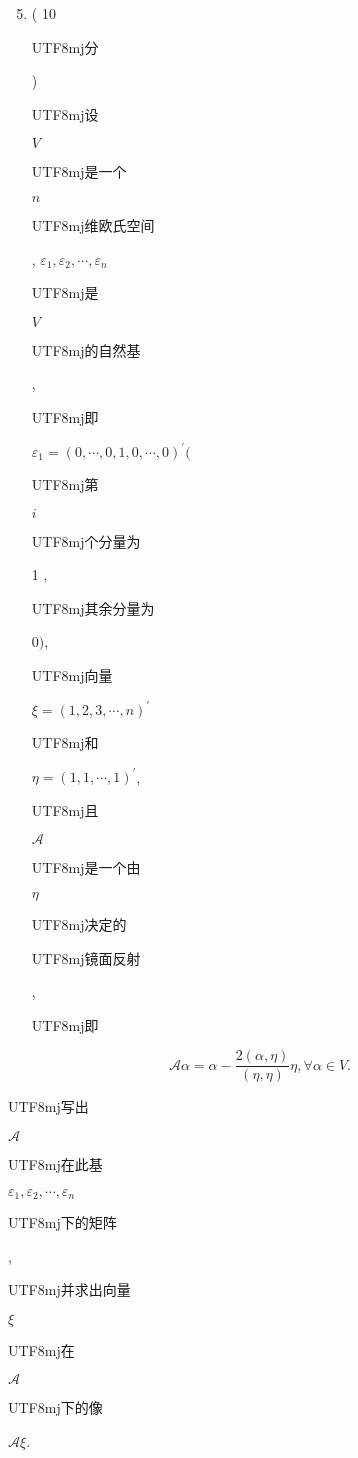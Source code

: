 \documentclass[10pt]{article}
\begin{document}
\begin{enumerate}
  \setcounter{enumi}{4}
  \item ( 10 \begin{CJK}{UTF8}{mj}分\end{CJK}) \begin{CJK}{UTF8}{mj}设\end{CJK} $V$ \begin{CJK}{UTF8}{mj}是一个\end{CJK} $n$ \begin{CJK}{UTF8}{mj}维欧氏空间\end{CJK}, $\varepsilon_{1}, \varepsilon_{2}, \cdots, \varepsilon_{n}$ \begin{CJK}{UTF8}{mj}是\end{CJK} $V$ \begin{CJK}{UTF8}{mj}的自然基\end{CJK}, \begin{CJK}{UTF8}{mj}即\end{CJK} $\varepsilon_{1}=(0, \cdots, 0,1,0, \cdots, 0)^{\prime}($ \begin{CJK}{UTF8}{mj}第\end{CJK} $i$ \begin{CJK}{UTF8}{mj}个分量为\end{CJK} 1 , \begin{CJK}{UTF8}{mj}其余分量为\end{CJK} 0$)$, \begin{CJK}{UTF8}{mj}向量\end{CJK} $\xi=(1,2,3, \cdots, n)^{\prime}$ \begin{CJK}{UTF8}{mj}和\end{CJK} $\eta=(1,1, \cdots, 1)^{\prime}$, \begin{CJK}{UTF8}{mj}且\end{CJK} $\mathscr{A}$ \begin{CJK}{UTF8}{mj}是一个由\end{CJK} $\eta$ \begin{CJK}{UTF8}{mj}决定的\end{CJK} \begin{CJK}{UTF8}{mj}镜面反射\end{CJK}, \begin{CJK}{UTF8}{mj}即\end{CJK}
\end{enumerate}
$$
\mathscr{A} \alpha=\alpha-\frac{2(\alpha, \eta)}{(\eta, \eta)} \eta, \forall \alpha \in V .
$$
\begin{CJK}{UTF8}{mj}写出\end{CJK} $\mathscr{A}$ \begin{CJK}{UTF8}{mj}在此基\end{CJK} $\varepsilon_{1}, \varepsilon_{2}, \cdots, \varepsilon_{n}$ \begin{CJK}{UTF8}{mj}下的矩阵\end{CJK}, \begin{CJK}{UTF8}{mj}并求出向量\end{CJK} $\xi$ \begin{CJK}{UTF8}{mj}在\end{CJK} $\mathscr{A}$ \begin{CJK}{UTF8}{mj}下的像\end{CJK} $\mathscr{A} \xi$.
\end{document}
